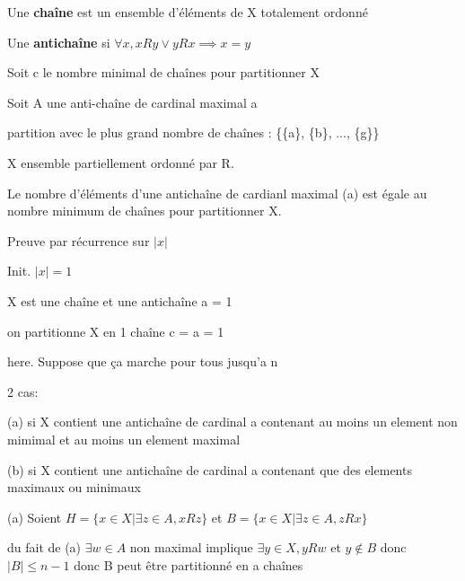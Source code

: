 \documentclass[a4paper, 12pt]{article}
\begin{document}


\begin{definition}
    Une \textbf{chaîne} est un ensemble d'éléments de X totalement ordonné
\end{definition}

\begin{definition}
    Une \textbf{antichaîne} si $\forall x, xRy \lor yRx \implies x = y$
\end{definition}

Soit c le nombre minimal de chaînes pour partitionner X

Soit A une anti-chaîne de cardinal maximal a

\begin{remark}
    partition avec le plus grand nombre de chaînes : \{\{a\}, \{b\}, ..., \{g\}\}
\end{remark}

\begin{proposition}
    X ensemble partiellement ordonné par R.

    Le nombre d'éléments d'une antichaîne de cardianl maximal (a) est
    égale au nombre minimum de chaînes pour partitionner X.
\end{proposition}

\begin{demonstration}
    Preuve par récurrence sur $|x|$

    Init. $|x| = 1$

    X est une chaîne et une antichaîne a = 1

    on partitionne X en 1 chaîne c = a = 1

    here. Suppose que ça marche pour tous jusqu'a n

    2 cas:

    (a) si X contient une antichaîne de cardinal a contenant au moins un element non mimimal et au moins un element maximal

    (b) si X contient une antichaîne de cardinal a contenant que des elements maximaux ou minimaux

    (a) Soient $H = \{x \in X | \exists z \in A, xRz\}$ et $B = \{x \in X | \exists z \in A, zRx\}$

    du fait de (a) $\exists w \in A$ non maximal implique $\exists y \in X, yRw$ et $y \notin B$ donc $|B| \leq n - 1$
    donc B peut être partitionné en a chaînes
\end{demonstration}
\end{document}
